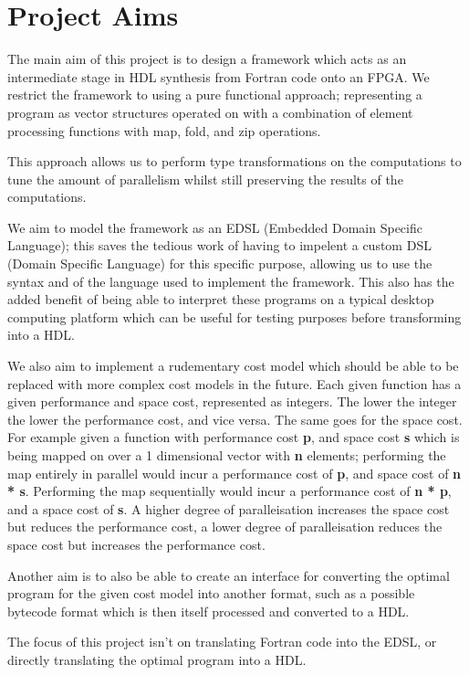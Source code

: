 \section{Project Aims}
The main aim of this project is to design a framework which acts as an intermediate stage in HDL synthesis from Fortran code onto
an FPGA. We restrict the framework to using a pure functional approach; representing a program as vector structures operated
on with a combination of element processing functions with map, fold, and zip operations.

This approach allows us to perform type transformations on the computations to tune the amount of parallelism
whilst still preserving the results of the computations. 

We aim to model the framework as an EDSL (Embedded Domain Specific Language); this saves the tedious work
of having to impelent a custom DSL (Domain Specific Language) for this specific purpose, allowing us to use the 
syntax and of the language used to implement the framework. This also has the added benefit of being able to interpret 
these programs on a typical desktop computing platform which can be useful for testing purposes before transforming into a 
HDL. 

We also aim to implement a rudementary cost model which should be able to be replaced with more complex
cost models in the future. Each given function has a given performance and space cost, represented as integers. 
The lower the integer the lower the performance cost, and vice versa. The same goes for the space cost. 
For example given a function with performance cost \textbf{p}, and space cost \textbf{s} which is being mapped on over
a 1 dimensional vector with \textbf{n} elements; performing the map entirely in parallel would incur a performance
cost of \textbf{p}, and space cost of \textbf{n * s}. Performing the map sequentially would incur a performance cost of
\textbf{n * p}, and a space cost of \textbf{s}. A higher degree of paralleisation increases the space cost but reduces
the performance cost, a lower degree of paralleisation reduces the space cost but increases the 
performance cost.

Another aim is to also be able to create an interface for converting the optimal program for the given cost model 
into another format, such as a possible bytecode format which is then itself processed and converted to a HDL.

The focus of this project isn't on translating Fortran code into the EDSL, or directly translating the optimal program 
into a HDL.
